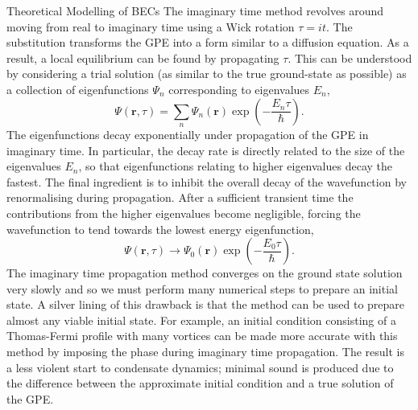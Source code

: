 \begin{chapter}{\label{cha:theoretical_model}Theoretical Modelling of BECs}
	The imaginary time method revolves around moving from real to imaginary time using a Wick rotation $\tau = it$. The substitution transforms the GPE into a form similar to a diffusion equation. As a result, a local equilibrium can be found by propagating $\tau$. This can be understood by considering a trial solution (as similar to the true ground-state as possible) as a collection of eigenfunctions $\Psi_n$ corresponding to eigenvalues $E_n$,
\begin{equation*}
\Psi(\mathbf{r},\tau) = \sum_n \Psi_n(\mathbf{r})\exp\left(-\frac{E_n\tau}{\hbar}\right).
\end{equation*}
The eigenfunctions decay exponentially under propagation of the GPE in imaginary time. In particular, the decay rate is directly related to the size of the eigenvalues $E_n$, so that eigenfunctions relating to higher eigenvalues decay the fastest. The final ingredient is to inhibit the overall decay of the wavefunction by renormalising during propagation. After a sufficient transient time the contributions from the higher eigenvalues become negligible, forcing the wavefunction to tend towards the lowest energy eigenfunction,
\begin{equation*}
\Psi(\mathbf{r},\tau) \rightarrow \Psi_0(\mathbf{r})\exp\left(-\frac{E_0\tau}{\hbar}\right).
\end{equation*}
The imaginary time propagation method converges on the ground state solution very slowly and so we must perform many numerical steps to prepare an initial state. A silver lining of this drawback is that the method can be used to prepare almost any viable initial state. For example, an initial condition consisting of a Thomas-Fermi profile with many vortices can be made more accurate with this method by imposing the phase during imaginary time propagation. The result is a less violent start to condensate dynamics; minimal sound is produced due to the difference between the approximate initial condition and a true solution of the GPE.


\end{chapter}
